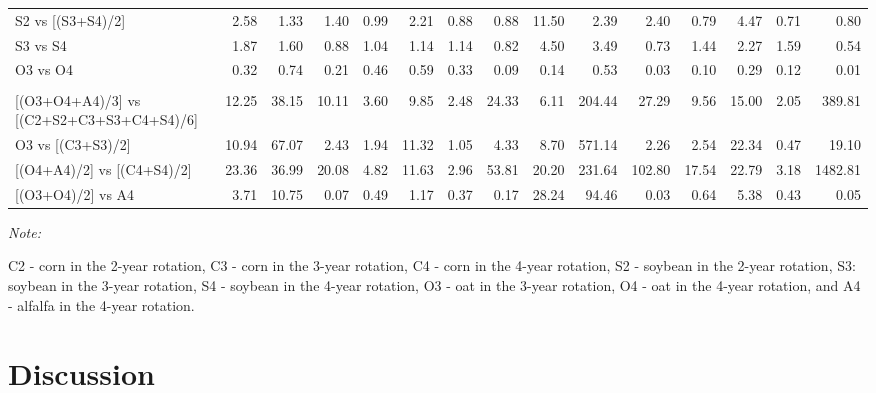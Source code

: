 \documentclass[
]{article}
\begin{document}
\begin{landscape}
\begin{table}
{\begin{threeparttable}
\begin{tabular}[t]{lrrrrrr>{}r|rrrrrrr}
\hspace{1em}S2 vs [(S3+S4)/2] & 2.58 & 1.33 & 1.40 & 0.99 & 2.21 & 0.88 & 0.88 & 11.50 & 2.39 & 2.40 & 0.79 & 4.47 & 0.71 & 0.80\\
\hspace{1em}S3 vs S4 & 1.87 & 1.60 & 0.88 & 1.04 & 1.14 & 1.14 & 0.82 & 4.50 & 3.49 & 0.73 & 1.44 & 2.27 & 1.59 & 0.54\\
\hspace{1em}O3 vs O4 & 0.32 & 0.74 & 0.21 & 0.46 & 0.59 & 0.33 & 0.09 & 0.14 & 0.53 & 0.03 & 0.10 & 0.29 & 0.12 & 0.01\\
\addlinespace[0.3em]
\multicolumn{15}{l}{\textbf{(C) - Crop type effects}}\\
\hspace{1em}{}[(O3+O4+A4)/3] vs [(C2+S2+C3+S3+C4+S4)/6] & 12.25 & 38.15 & 10.11 & 3.60 & 9.85 & 2.48 & 24.33 & 6.11 & 204.44 & 27.29 & 9.56 & 15.00 & 2.05 & 389.81\\
\hspace{1em}O3 vs [(C3+S3)/2] & 10.94 & 67.07 & 2.43 & 1.94 & 11.32 & 1.05 & 4.33 & 8.70 & 571.14 & 2.26 & 2.54 & 22.34 & 0.47 & 19.10\\
\hspace{1em}{}[(O4+A4)/2] vs [(C4+S4)/2] & 23.36 & 36.99 & 20.08 & 4.82 & 11.63 & 2.96 & 53.81 & 20.20 & 231.64 & 102.80 & 17.54 & 22.79 & 3.18 & 1482.81\\
\hspace{1em}{}[(O3+O4)/2] vs A4 & 3.71 & 10.75 & 0.07 & 0.49 & 1.17 & 0.37 & 0.17 & 28.24 & 94.46 & 0.03 & 0.64 & 5.38 & 0.43 & 0.05\\
\bottomrule
\end{tabular}
\begin{tablenotes}[para]
\item \textit{Note: } 
\item C2 - corn in the 2-year rotation, C3 - corn in the 3-year rotation, C4 - corn in the 4-year rotation, S2 - soybean in the 2-year rotation, S3: soybean in the 3-year rotation, S4 - soybean in the 4-year rotation, O3 - oat in the 3-year rotation, O4 - oat in the 4-year rotation, and A4 - alfalfa in the 4-year rotation.
\end{tablenotes}
\end{threeparttable}}
\end{table}
\end{landscape}

\hypertarget{discussion}{%
\section*{Discussion}\label{discussion}}
\end{document}
